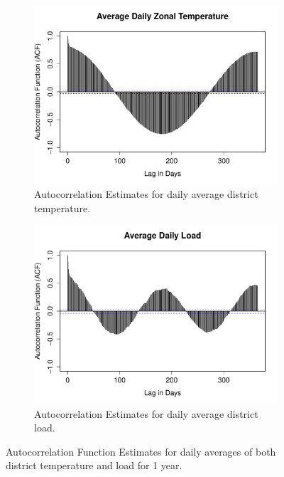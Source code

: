 \documentclass[conference]{IEEEtran}
\begin{document}
\begin{figure}[!ht]
\centering
\begin{subfigure}[b]{.49\linewidth}
\includegraphics[width=\linewidth]{gfx/daily-avg-temp-1year.pdf}
\caption{Autocorrelation Estimates for daily average district temperature.}
\label{subfig:acf-temp-1year}
\end{subfigure}
\begin{subfigure}[b]{.49\linewidth}
\includegraphics[width=\linewidth]{gfx/avg-daily-load-1year.pdf}
\caption{Autocorrelation Estimates for daily average district load.}
\label{subfig:acf-load-1year}
\end{subfigure}
\caption{Autocorrelation Function Estimates for daily averages of both district temperature and load for 1 year.}
\label{fig:seasonality}
\end{figure}
\end{document}
